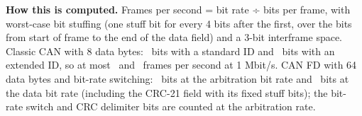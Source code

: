 {\small
\textbf{How this is computed.} Frames per second = bit rate ÷ bits per frame, with worst-case bit
stuffing (one stuff bit for every 4 bits after the first, over the bits from start of frame to the
end of the data field) and a 3-bit interframe space. Classic CAN with 8 data bytes: \stdbits\ bits
with a standard ID and \extbits\ bits with an extended ID, so at most \stdmax\ and \extmax\ frames
per second at 1 Mbit/s. CAN FD with 64 data bytes and bit-rate switching: \fdnombits\ bits at the
arbitration bit rate and \fddatabits\ bits at the data bit rate (including the CRC-21 field with its
fixed stuff bits); the bit-rate switch and CRC delimiter bits are counted at the arbitration rate.
\par}

